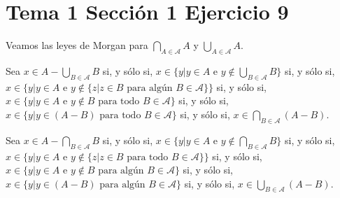 \documentclass{article}
\begin{document}
\section{Tema 1 Sección 1 Ejercicio 9}
Veamos las leyes de Morgan para $\bigcap_{A\in \mathcal{A}}A$ y  $\bigcup_{A\in \mathcal{A}}A$.

Sea $x\in A-\bigcup_{B\in \mathcal{A}}B$ si, y sólo si, $x\in\{y|y\in A \text{ e }y\notin\bigcup_{B\in \mathcal{A}}B \}$ si, y sólo si, $x\in\{y|y\in A \text{ e }y\notin\{z|z\in B\text{ para algún }B\in \mathcal{A}\}\}$ si, y sólo si, $x\in\{y|y\in A \text{ e }y\notin B \text{ para todo }B\in \mathcal{A}\}$ si, y sólo si, $x\in\{y|y\in (A - B) \text{ para todo }B\in \mathcal{A}\}$ si, y sólo si, $x\in \bigcap_{B\in \mathcal{A}}(A-B)$.

Sea $x\in A-\bigcap_{B\in \mathcal{A}}B$ si, y sólo si, $x\in\{y|y\in A \text{ e }y\notin\bigcap_{B\in \mathcal{A}}B \}$ si, y sólo si, $x\in\{y|y\in A \text{ e }y\notin\{z|z\in B\text{ para todo }B\in \mathcal{A}\}\}$ si, y sólo si, $x\in\{y|y\in A \text{ e }y\notin B \text{ para algún }B\in \mathcal{A}\}$ si, y sólo si, $x\in\{y|y\in (A - B) \text{ para algún }B\in \mathcal{A}\}$ si, y sólo si, $x\in \bigcup_{B\in \mathcal{A}}(A-B)$.
\end{document}
